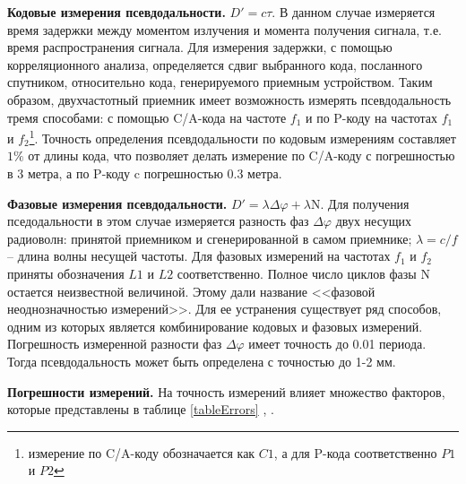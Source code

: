 \documentclass[a4paper]{article}
\begin{document}
\textbf{Кодовые измерения псевдодальности.} $D' = c \tau$. В данном случае измеряется время задержки между моментом излучения и момента получения сигнала, т.е. время распространения сигнала. Для измерения задержки, с помощью корреляционного анализа, определяется сдвиг выбранного кода, посланного спутником, относительно кода, генерируемого приемным устройством. Таким образом, двухчастотный приемник имеет возможность измерять псевдодальность тремя способами: с помощью C/A-кода на частоте $f_1$ и по P-коду на частотах $f_1$ и $f_2$\footnote{измерение по C/A-коду обозначается как $C1$, а для P-кода соответственно $P1$ и $P2$}. Точность определения псевдодальности по кодовым измерениям составляет $1\%$ от длины кода, что позволяет делать измерение по C/A-коду с погрешностью в 3 метра, а по P-коду c погрешностью 0.3 метра.

\textbf{Фазовые измерения псевдодальности.} $D' = \lambda \Delta \varphi + \lambda \text{N}$. Для получения пседодальности в этом случае измеряется разность фаз $\Delta\varphi$ двух несущих радиоволн: принятой приемником и сгенерированной в самом приемнике; $\lambda = c / f$ -- длина волны несущей частоты. Для фазовых измерений на частотах $f_1$ и $f_2$ приняты обозначения $L1$ и $L2$ соответственно. Полное число циклов фазы N остается неизвестной величиной. Этому дали название <<фазовой неоднозначностью измерений>>. Для ее устранения существует ряд способов, одним из которых является комбинирование кодовых и фазовых измерений. Погрешность измеренной разности фаз $\Delta\varphi$ имеет точность до 0.01 периода. Тогда псевдодальность может быть определена с точностью до 1-2 мм.

\textbf{Погрешности измерений.} На точность измерений влияет множество факторов, которые представлены в таблице \ref{tableErrors} \cite{hoffmanErrors}, \cite{shebshaevich}.
\end{document}
